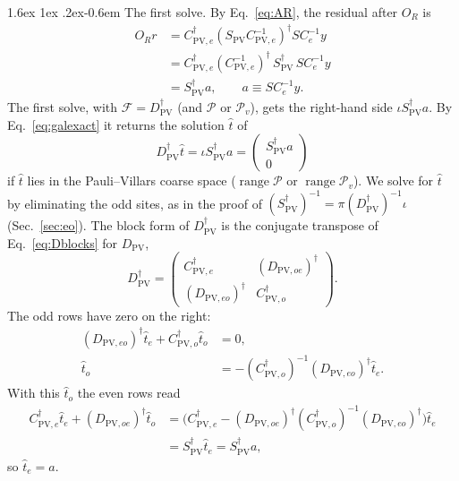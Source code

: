 \documentclass[11pt,a4paper]{article}
\makeatletter
\renewcommand\paragraph{\@startsection{paragraph}{4}{\z@}%
  {1.6ex \@plus 1ex \@minus .2ex}{-0.6em}%
  {\normalfont\normalsize\itshape}}
\numberwithin{equation}{section}
\newcommand{\dg}{^{\dagger}}
\newcommand{\Dpv}{D_{\mathrm{PV}}}
\newcommand{\Spv}{S_{\mathrm{PV}}}
\newcommand{\Pro}{\mathcal P}
\newcommand{\Pv}{\Pro_v}
\newcommand{\Ce}{C_{e}}
\newcommand{\Cpve}{C_{\mathrm{PV},e}}
\newcommand{\Cpvo}{C_{\mathrm{PV},o}}
\makeatother
\begin{document}
\paragraph{The first solve.} By Eq.~\eqref{eq:AR}, the residual after $O_R$ is
\begin{align*}
O_Rr&=\Cpve\dg(\Spv\Cpve^{-1})\dg S\Ce^{-1}y\\
&=\Cpve\dg(\Cpve^{-1})\dg\,\Spv\dg\,S\Ce^{-1}y\\
&=\Spv\dg a,\qquad a\equiv S\Ce^{-1}y .
\end{align*}
The first solve, with $\mathcal F=\Dpv\dg$ (and $\Pro$ or $\Pv$), gets the right-hand side
$\iota\Spv\dg a$. By Eq.~\eqref{eq:galexact} it returns the solution $\hat t$ of
\begin{equation*}
\Dpv\dg\hat t=\iota\Spv\dg a=\begin{pmatrix}\Spv\dg a\\0\end{pmatrix}
\end{equation*}
if $\hat t$ lies in the Pauli--Villars coarse space ($\operatorname{range}\Pro$ or
$\operatorname{range}\Pv$). We solve for $\hat t$ by eliminating the odd sites, as
in the proof of $(\Spv\dg)^{-1}=\pi(\Dpv\dg)^{-1}\iota$ (Sec.~\ref{sec:eo}). The block form of
$\Dpv\dg$ is the conjugate transpose of Eq.~\eqref{eq:Dblocks} for $\Dpv$,
\begin{equation*}
\Dpv\dg=\begin{pmatrix}\Cpve\dg&(D_{\mathrm{PV},oe})\dg\\(D_{\mathrm{PV},eo})\dg&\Cpvo\dg\end{pmatrix}.
\end{equation*}
The odd rows have zero on the right:
\begin{align*}
(D_{\mathrm{PV},eo})\dg\hat t_e+\Cpvo\dg\hat t_o&=0,\\
\hat t_o&=-(\Cpvo\dg)^{-1}(D_{\mathrm{PV},eo})\dg\hat t_e .
\end{align*}
With this $\hat t_o$ the even rows read
\begin{align*}
\Cpve\dg\hat t_e+(D_{\mathrm{PV},oe})\dg\hat t_o
&=\big(\Cpve\dg-(D_{\mathrm{PV},oe})\dg(\Cpvo\dg)^{-1}(D_{\mathrm{PV},eo})\dg\big)\hat t_e\\
&=\Spv\dg\hat t_e=\Spv\dg a ,
\end{align*}
so $\hat t_e=a$.
\end{document}
